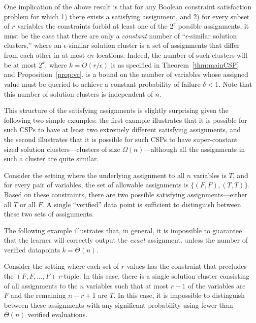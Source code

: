 \documentclass[final,12pt]{colt2018}
\newcommand{\eps}{\epsilon}
\begin{document}
One implication of the above result is that for any Boolean constraint satisfaction problem for which 1) there exists a satisfying assignment, and 2) for every subset of $r$ variables the constraints forbid at least one of the $2^r$ possible assignments, it  must be the case that there are only a \emph{constant} number of ``$\eps$-similar solution clusters,'' where an $\eps$-similar solution cluster is a set of assignments that differ from each other in at most $\eps n$ locations.  Indeed, the number of such clusters will be at most $2^k$, where $k = \tilde{O}(r/\eps)$ is as specified in Theorem~\ref{thm:mainCSP} and Proposition~\ref{prop:vc}, is a bound on the number of variables whose assigned value must be queried to achieve a constant probability of failure $\delta < 1$.   Note that this number of solution clusters is independent of $n$.  

This structure of the satisfying assignments is slightly surprising given the following two simple examples: the first example illustrates that it is possible for such CSPs to have at least two extremely different satisfying assignments, and the second illustrates that it is possible for such CSPs to have super-constant sized solution clusters---clusters of size $\Omega(n)$---although all the assignments in such a cluster are quite similar. 

\begin{example}
Consider the setting where the underlying assignment to all $n$ variables is $T$, and for every pair of variables, the set of allowable assignments is $\{(F,F), (T,T)\}$.  Based on these constraints, there are two possible satisfying assignments---either all $T$ or all $F$.    A single ``verified'' data point is sufficient to distinguish between these two sets of assignments.
\end{example}

The following example illustrates that, in general, it is impossible to guarantee that the learner will correctly output the \emph{exact} assignment, unless the number of verified datapoints $k = \Theta(n)$.
\begin{example}
Consider the setting where each set of $r$ values has the constraint that precludes the $(F,F,\ldots,F)$ $r$-tuple.  In this case, there is a single solution cluster consisting of all assignments to the $n$ variables such that at most $r-1$ of the variables are $F$ and the remaining $n-r+1$ are $T$.  In this case, it is impossible to distinguish between these assignments with any significant probability using fewer than  $\Theta(n)$ verified evaluations.
\end{example} 
\end{document}
